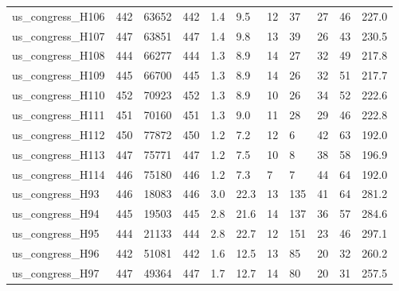 \begin{longtable}{lllllllllll}
 us\_congress\_H106                                   & 442        & 63652     & 442   & 1.4    & 9.5    & 12    & 37     & 27     & 46     & 227.0   \\
 us\_congress\_H107                                   & 447        & 63851     & 447   & 1.4    & 9.8    & 13    & 39     & 26     & 43     & 230.5   \\
 us\_congress\_H108                                   & 444        & 66277     & 444   & 1.3    & 8.9    & 14    & 27     & 32     & 49     & 217.8   \\
 us\_congress\_H109                                   & 445        & 66700     & 445   & 1.3    & 8.9    & 14    & 26     & 32     & 51     & 217.7   \\
 us\_congress\_H110                                   & 452        & 70923     & 452   & 1.3    & 8.9    & 10    & 26     & 34     & 52     & 222.6   \\
 us\_congress\_H111                                   & 451        & 70160     & 451   & 1.3    & 9.0    & 11    & 28     & 29     & 46     & 222.8   \\
 us\_congress\_H112                                   & 450        & 77872     & 450   & 1.2    & 7.2    & 12    & 6      & 42     & 63     & 192.0   \\
 us\_congress\_H113                                   & 447        & 75771     & 447   & 1.2    & 7.5    & 10    & 8      & 38     & 58     & 196.9   \\
 us\_congress\_H114                                   & 446        & 75180     & 446   & 1.2    & 7.3    & 7     & 7      & 44     & 64     & 192.0   \\
 us\_congress\_H93                                    & 446        & 18083     & 446   & 3.0    & 22.3   & 13    & 135    & 41     & 64     & 281.2   \\
 us\_congress\_H94                                    & 445        & 19503     & 445   & 2.8    & 21.6   & 14    & 137    & 36     & 57     & 284.6   \\
 us\_congress\_H95                                    & 444        & 21133     & 444   & 2.8    & 22.7   & 12    & 151    & 23     & 46     & 297.1   \\
 us\_congress\_H96                                    & 442        & 51081     & 442   & 1.6    & 12.5   & 13    & 85     & 20     & 32     & 260.2   \\
 us\_congress\_H97                                    & 447        & 49364     & 447   & 1.7    & 12.7   & 14    & 80     & 20     & 31     & 257.5   \\

\end{longtable}
